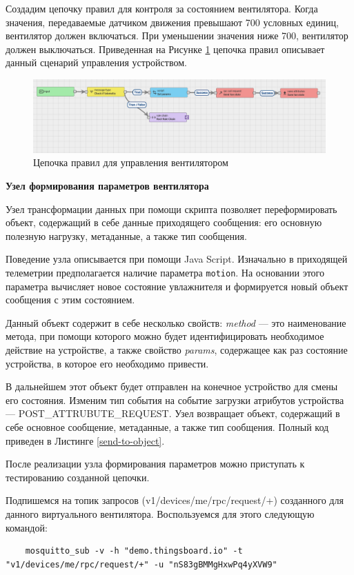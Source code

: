 \documentclass[a4paper,14pt]{extarticle}
\begin{document}
Создадим цепочку правил для контроля за состоянием вентилятора. Когда значения, передаваемые датчиком движения превышают 700 условных единиц, вентилятор должен включаться. При уменьшении значения ниже 700, вентилятор должен выключаться. Приведенная на Рисунке \ref{fig:chains} цепочка правил описывает данный сценарий управления устройством.

\begin{figure}[h!]
	\centering
	\includegraphics[width=0.6\linewidth]{images/chains}
	\caption{Цепочка правил для управления вентилятором}
	\label{fig:chains}
\end{figure}


\textbf{Узел формирования параметров вентилятора}

Узел трансформации данных при помощи скрипта позволяет переформировать объект,
содержащий в себе данные приходящего сообщения: его основную полезную нагрузку,
метаданные, а также тип сообщения.

Поведение узла описывается при помощи Java Script. Изначально в приходящей телеметрии
предполагается наличие параметра \texttt{motion}. На основании этого параметра
вычисляет новое состояние увлажнителя и формируется новый объект сообщения с этим
состоянием. 

Данный объект содержит в себе несколько свойств: \textit{method} --- это наименование
метода, при помощи которого можно будет идентифицировать необходимое действие на
устройстве, а также свойство \textit{params}, содержащее как раз состояние устройства, в которое
его необходимо привести. 

В дальнейшем этот объект будет отправлен на конечное
устройство для смены его состояния. Изменим тип события на событие загрузки
атрибутов устройства --- POST\_ATTRUBUTE\_REQUEST. Узел возвращает объект, содержащий в себе основное
сообщение, метаданные, а также тип сообщения. Полный код приведен в Листинге \ref{send-to-object}.




После реализации узла формирования параметров можно приступать к тестированию созданной цепочки. 

Подпишемся на топик запросов (v1/devices/me/rpc/request/+) созданного для данного
виртуального вентилятора. Воспользуемся для этого следующую командой:
\begin{lstlisting}
	mosquitto_sub -v -h "demo.thingsboard.io" -t "v1/devices/me/rpc/request/+" -u "nS83gBMMgHxwPq4yXVW9"
\end{lstlisting}
\end{document}
